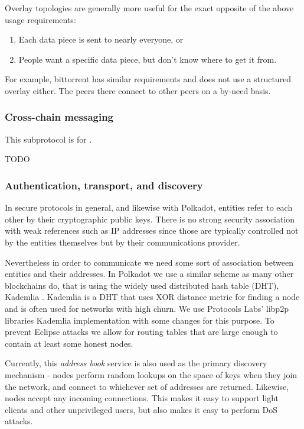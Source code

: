 Overlay topologies are generally more useful for the exact opposite of the
above usage requirements:

\begin{enumerate}
\item Each data piece is sent to nearly everyone, or
\item People want a specific data piece, but don't know where to get it from.
\end{enumerate}

For example, bittorrent has similar requirements and does not use a structured
overlay either. The peers there connect to other peers on a by-need basis.

\subsubsection{Cross-chain messaging} \label{sec:net_crosschain}

This subprotocol is for .

TODO

\subsubsection{Authentication, transport, and discovery} \label{sec:net_lowlevel}

In secure protocols in general, and likewise with Polkadot, entities refer to each other by their cryptographic public keys. There is no strong security association with weak references such as IP addresses since those are typically controlled not by the entities themselves but by their communications provider.

Nevertheless in order to communicate we need some sort of association between entities and their addresses. In Polkadot we use a similar scheme as many other blockchains do, that is using the widely used distributed hash table (DHT), Kademlia \cite{Maymounkov:2002:Kademila}. Kademlia is a DHT that uses XOR distance metric for finding a node and is often used for networks with high churn. We use Protocols Labs' libp2p libraries \cite{} Kademlia implementation with some changes for this purpose. To prevent Eclipse attacks \cite{eclipseattack} we allow for routing tables that are large enough to contain at least some honest nodes.

Currently, this \emph{address book} service is also used as the primary discovery mechanism - nodes perform random lookups on the space of keys when they join the network, and connect to whichever set of addresses are returned. Likewise, nodes accept any incoming connections. This makes it easy to support light clients and other unprivileged users, but also makes it easy to perform DoS attacks.

